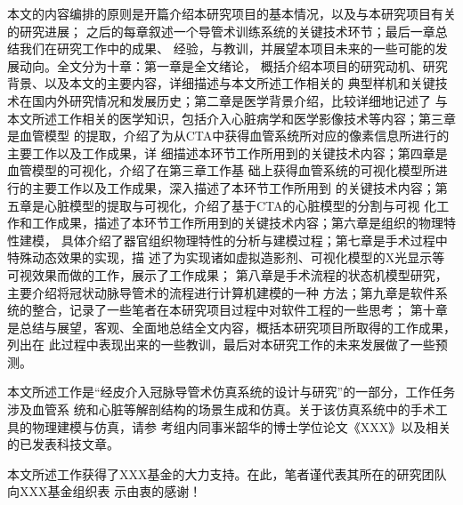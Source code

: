 本文的内容编排的原则是开篇介绍本研究项目的基本情况，以及与本研究项目有关的研究进展；
之后的每章叙述一个导管术训练系统的关键技术环节；最后一章总结我们在研究工作中的成果、
经验，与教训，并展望本项目未来的一些可能的发展动向。全文分为十章：第一章是全文绪论，
概括介绍本项目的研究动机、研究背景、以及本文的主要内容，详细描述与本文所述工作相关的
典型样机和关键技术在国内外研究情况和发展历史；第二章是医学背景介绍，比较详细地记述了
与本文所述工作相关的医学知识，包括介入心脏病学和医学影像技术等内容；第三章是血管模型
的提取，介绍了为从CTA中获得血管系统所对应的像素信息所进行的主要工作以及工作成果，详
细描述本环节工作所用到的关键技术内容；第四章是血管模型的可视化，介绍了在第三章工作基
础上获得血管系统的可视化模型所进行的主要工作以及工作成果，深入描述了本环节工作所用到
的关键技术内容；第五章是心脏模型的提取与可视化，介绍了基于CTA的心脏模型的分割与可视
化工作和工作成果，描述了本环节工作所用到的关键技术内容；第六章是组织的物理特性建模，
具体介绍了器官组织物理特性的分析与建模过程；第七章是手术过程中特殊动态效果的实现，描
述了为实现诸如虚拟造影剂、可视化模型的X光显示等可视效果而做的工作，展示了工作成果；
第八章是手术流程的状态机模型研究，主要介绍将冠状动脉导管术的流程进行计算机建模的一种
方法；第九章是软件系统的整合，记录了一些笔者在本研究项目过程中对软件工程的一些思考；
第十章是总结与展望，客观、全面地总结全文内容，概括本研究项目所取得的工作成果，列出在
此过程中表现出来的一些教训，最后对本研究工作的未来发展做了一些预测。

本文所述工作是“经皮介入冠脉导管术仿真系统的设计与研究”的一部分，工作任务涉及血管系
统和心脏等解剖结构的场景生成和仿真。关于该仿真系统中的手术工具的物理建模与仿真，请参
考组内同事米韶华的博士学位论文《XXX》以及相关的已发表科技文章。

本文所述工作获得了XXX基金的大力支持。在此，笔者谨代表其所在的研究团队向XXX基金组织表
示由衷的感谢！